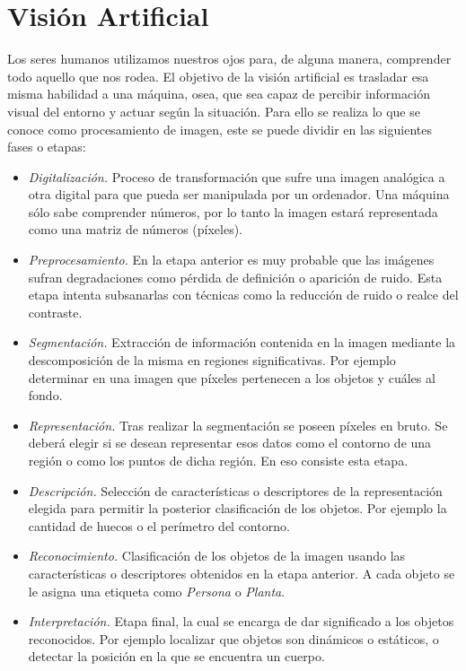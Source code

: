 \section{Visión Artificial}

Los seres humanos utilizamos nuestros ojos para, de alguna manera, comprender todo aquello que nos rodea. El objetivo de la visión artificial es trasladar esa misma habilidad a una máquina, osea, que sea capaz de percibir información visual del entorno y actuar según la situación. Para ello se realiza lo que se conoce como procesamiento de imagen, este se puede dividir en las siguientes fases o etapas:

\begin{itemize}
    \item \textit{Digitalización.} Proceso de transformación que sufre una imagen analógica a otra digital para que pueda ser manipulada por un ordenador. Una máquina sólo sabe comprender números, por lo tanto la imagen estará representada como una matriz de números (píxeles).
    
    \item \textit{Preprocesamiento.} En la etapa anterior es muy probable que las imágenes sufran degradaciones como pérdida de definición o aparición de ruido. Esta etapa intenta subsanarlas con técnicas como la reducción de ruido o realce del contraste.
    
    \item \textit{Segmentación.} Extracción de información contenida en la imagen mediante la descomposición de la misma en regiones significativas. Por ejemplo determinar en una imagen que píxeles pertenecen a los objetos y cuáles al fondo.
    
    \item \textit{Representación.} Tras realizar la segmentación se poseen píxeles en bruto. Se deberá elegir si se desean representar esos datos como el contorno de una región o como los puntos de dicha región. En eso consiste esta etapa.
    
    \item \textit{Descripción.} Selección de características o descriptores de la representación elegida para permitir la posterior clasificación de los objetos. Por ejemplo la cantidad de huecos o el perímetro del contorno.
    
    \item \textit{Reconocimiento.} Clasificación de los objetos de la imagen usando las características o descriptores obtenidos en la etapa anterior. A cada objeto se le asigna una etiqueta como \textit{Persona} o \textit{Planta}.
    
    \item \textit{Interpretación.} Etapa final, la cual se encarga de dar significado a los objetos reconocidos. Por ejemplo localizar que objetos son dinámicos o estáticos, o detectar la posición en la que se encuentra un cuerpo.
\end{itemize}

